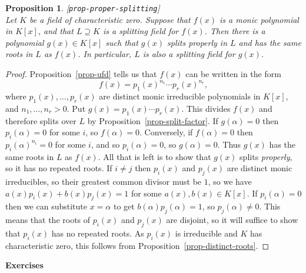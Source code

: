 \documentclass{amsart}
\newcommand{\lbl}[1]{\label{#1}\textup{[\texttt{#1}]}\ \\}
\newcommand{\lbl}{\label}
\newcommand{\al}        {\alpha}
\renewcommand{\:}{\colon}
\newtheorem{proposition}[theorem]{Proposition}
\theoremstyle{definition}
\begin{document}
\begin{proposition}\lbl{prop-proper-splitting}
 Let $K$ be a field of characteristic zero.  Suppose that $f(x)$ is a
 monic polynomial in $K[x]$, and that $L\supseteq K$ is a splitting
 field for $f(x)$.  Then there is a polynomial $g(x)\in K[x]$ such
 that $g(x)$ splits properly in $L$ and has the same roots in $L$ as
 $f(x)$.  In particular, $L$ is also a splitting field for $g(x)$.
\end{proposition}
\begin{proof}
 Proposition~\ref{prop-ufd} tells us that $f(x)$ can be written in the
 form 
 \[ f(x) = p_1(x)^{n_1}\dotsb p_r(x)^{n_r}, \]
 where $p_1(x),\dotsc,p_r(x)$ are distinct monic irreducible
 polynomials in $K[x]$, and $n_1,\dotsc,n_r>0$.  Put
 $g(x)=p_1(x)\dotsb p_r(x)$.  This divides $f(x)$ and therefore splits
 over $L$ by Proposition~\ref{prop-split-factor}.  If $g(\al)=0$ then
 $p_i(\al)=0$ for some $i$, so $f(\al)=0$.  Conversely, if $f(\al)=0$
 then $p_i(\al)^{n_i}=0$ for some $i$, and so $p_i(\al)=0$, so
 $g(\al)=0$.  Thus $g(x)$ has the same roots in $L$ as $f(x)$.  All
 that is left is to show that $g(x)$ splits \emph{properly}, so it has
 no repeated roots.  If $i\neq j$ then $p_i(x)$ and $p_j(x)$ are
 distinct monic irreducibles, so their greatest common divisor must be
 $1$, so we have $a(x)p_i(x)+b(x)p_j(x)=1$ for some $a(x),b(x)\in
 K[x]$.  If $p_i(\al)=0$ then we can substitute $x=\al$ to get
 $b(\al)p_j(\al)=1$, so $p_j(\al)\neq 0$.  This means that the roots
 of $p_i(x)$ and $p_j(x)$ are disjoint, so it will suffice to show
 that $p_i(x)$ has no repeated roots.  As $p_i(x)$ is irreducible and
 $K$ has characteristic zero, this follows from
 Proposition~\ref{prop-distinct-roots}.
\end{proof}


\begin{center}
 \Large \textbf{Exercises}
\end{center}
\end{document}
